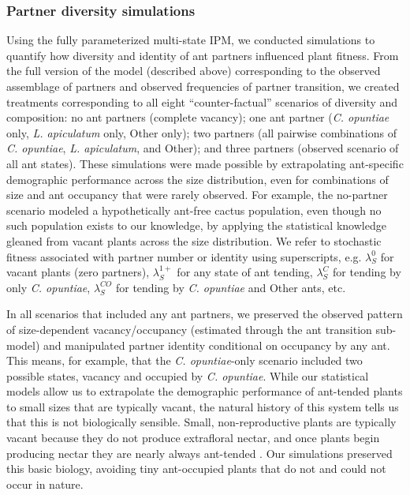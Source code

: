 \documentclass[11pt]{article}
\begin{document}
\subsubsection*{Partner diversity simulations}
Using the fully parameterized multi-state IPM, we conducted simulations to quantify how diversity and identity of ant partners influenced plant fitness. 
From the full version of the model (described above) corresponding to the observed assemblage of partners and observed frequencies of partner transition, we created treatments corresponding to all eight ``counter-factual'' scenarios of diversity and composition: no ant partners (complete vacancy); one ant partner (\textit{C. opuntiae} only, \textit{L. apiculatum} only, Other only); two partners (all pairwise combinations of \textit{C. opuntiae}, \textit{L. apiculatum}, and Other); and three partners (observed scenario of all ant states).
These simulations were made possible by extrapolating ant-specific demographic performance across the size distribution, even for combinations of size and ant occupancy that were rarely observed. 
For example, the no-partner scenario modeled a hypothetically ant-free cactus population, even though no such population exists to our knowledge, by applying the statistical knowledge gleaned from vacant plants across the size distribution. 
We refer to stochastic fitness associated with partner number or identity using superscripts, e.g. $\lambda^{0}_{S}$ for vacant plants (zero partners), $\lambda^{1+}_{S}$ for any state of ant tending, $\lambda^{C}_{S}$ for tending by only \textit{C. opuntiae}, $\lambda^{CO}_{S}$ for tending by \textit{C. opuntiae} and Other ants, etc.

In all scenarios that included any ant partners, we preserved the observed pattern of size-dependent vacancy/occupancy (estimated through the ant transition sub-model) and manipulated partner identity conditional on occupancy by any ant. 
This means, for example, that the \textit{C. opuntiae}-only scenario included two possible states, vacancy and occupied by \textit{C. opuntiae}. 
While our statistical models allow us to extrapolate the demographic performance of ant-tended plants to small sizes that are typically vacant, the natural history of this system tells us that this is not biologically sensible. 
Small, non-reproductive plants are typically vacant because they do not produce extrafloral nectar, and once plants begin producing nectar they are nearly always ant-tended \citep{Miller2014}. 
Our simulations preserved this basic biology, avoiding tiny ant-occupied plants that do not and could not occur in nature. 
\end{document}
